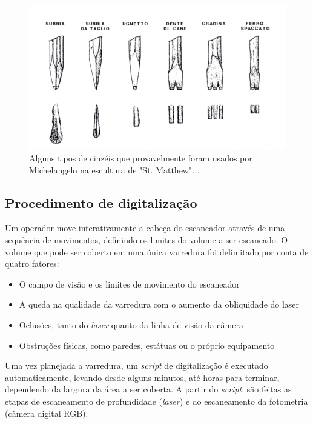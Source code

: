 
\begin{figure}
	\centering
	\includegraphics[width=0.5\linewidth]{figs/ferramentasMich.png}
	\caption{%
	Alguns tipos de cinzéis que provavelmente foram usados por Michelangelo na escultura de "St. Matthew".
	\protect\cite{levoy2000digital}.
	}\label{fig:cinzeis}
\end{figure}

\subsection*{Procedimento de digitalização}

Um operador move interativamente a cabeça do escaneador através de uma
sequência de movimentos, definindo os limites do volume a ser escaneado. O
volume que pode ser coberto em uma única varredura foi delimitado por conta de
quatro fatores:
\begin{itemize}
\item{O campo de visão e os limites de movimento do escaneador}
\item{A  queda na qualidade da varredura com o aumento da obliquidade do laser}
\item{Oclusões, tanto do \emph{laser} quanto da linha de visão da câmera}
\item{Obstruções físicas, como paredes, estátuas ou o próprio equipamento}
\end{itemize}

Uma vez planejada a varredura, um \emph{script} de digitalização é executado
automaticamente, levando desde alguns minutos, até horas para terminar,
dependendo da largura da área a ser coberta.  A partir do \emph{script}, são feitas as
etapas de escaneamento de profundidade (\emph{laser}) e do escaneamento da fotometria
(câmera digital RGB).

